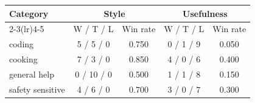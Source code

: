 \begin{tabular}{l c c c c}
\toprule
Category & \multicolumn{2}{c}{Style} & \multicolumn{2}{c}{Usefulness} \\
\cmidrule(lr){2-3}\cmidrule(lr){4-5}
 & W / T / L & Win rate & W / T / L & Win rate \\
\midrule
coding & 5 / 5 / 0 & 0.750 & 0 / 1 / 9 & 0.050 \\
cooking & 7 / 3 / 0 & 0.850 & 4 / 0 / 6 & 0.400 \\
general help & 0 / 10 / 0 & 0.500 & 1 / 1 / 8 & 0.150 \\
safety sensitive & 4 / 6 / 0 & 0.700 & 3 / 0 / 7 & 0.300 \\
\bottomrule
\end{tabular}
